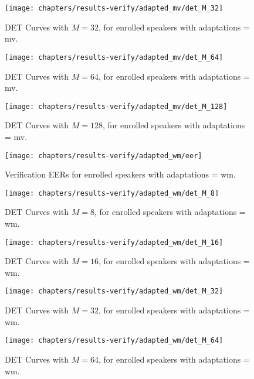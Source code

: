 \begin{figure}[ht]
	\centering
	\texttt{[image: chapters/results-verify/adapted\_mv/det\_M\_32]}
	\caption{DET Curves with $M = 32$, for enrolled speakers with adaptations = mv.}
	\label{fig:results-verify-adapted_mv-M_32}
\end{figure}

\begin{figure}[ht]
	\centering
	\texttt{[image: chapters/results-verify/adapted\_mv/det\_M\_64]}
	\caption{DET Curves with $M = 64$, for enrolled speakers with adaptations = mv.}
	\label{fig:results-verify-adapted_mv-M_64}
\end{figure}

\clearpage
\begin{figure}[ht]
	\centering
	\texttt{[image: chapters/results-verify/adapted\_mv/det\_M\_128]}
	\caption{DET Curves with $M = 128$, for enrolled speakers with adaptations = mv.}
	\label{fig:results-verify-adapted_mv-M_128}
\end{figure}

\newpage


\begin{figure}[ht]
	\centering
	\texttt{[image: chapters/results-verify/adapted\_wm/eer]}
	\caption{Verification EERs for enrolled speakers with adaptations = wm.}
	\label{fig:results-verify-adapted_wm}
\end{figure}

\begin{figure}[ht]
	\centering
	\texttt{[image: chapters/results-verify/adapted\_wm/det\_M\_8]}
	\caption{DET Curves with $M = 8$, for enrolled speakers with adaptations = wm.}
	\label{fig:results-verify-adapted_wm-M_8}
\end{figure}

\begin{figure}[ht]
	\centering
	\texttt{[image: chapters/results-verify/adapted\_wm/det\_M\_16]}
	\caption{DET Curves with $M = 16$, for enrolled speakers with adaptations = wm.}
	\label{fig:results-verify-adapted_wm-M_16}
\end{figure}

\begin{figure}[ht]
	\centering
	\texttt{[image: chapters/results-verify/adapted\_wm/det\_M\_32]}
	\caption{DET Curves with $M = 32$, for enrolled speakers with adaptations = wm.}
	\label{fig:results-verify-adapted_wm-M_32}
\end{figure}

\begin{figure}[ht]
	\centering
	\texttt{[image: chapters/results-verify/adapted\_wm/det\_M\_64]}
	\caption{DET Curves with $M = 64$, for enrolled speakers with adaptations = wm.}
	\label{fig:results-verify-adapted_wm-M_64}
\end{figure}

